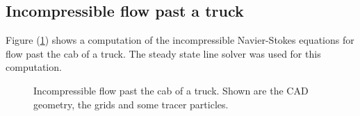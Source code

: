 \subsection{Incompressible flow past a truck}\label{sec:truckFlow}

Figure (\ref{fig:cabTender}) shows a computation of the incompressible Navier-Stokes
equations for flow past the cab of a truck. The steady state line solver was used for this
computation.



{
\newcommand{\figWidthd}{7.5cm}
\newcommand{\trimfig}[2]{\trimPlot{#1}{#2}{.0}{.0}{.075}{.15}}
\newcommand{\figWidtha}{10cm}
\newcommand{\trimfiga}[2]{\trimPlot{#1}{#2}{.0}{.0}{.2}{.2}}
\begin{figure}[hbt]
\begin{center}
\end{center}
\caption{Incompressible flow past the cab of a truck. Shown are the CAD geometry, the grids and
     some tracer particles.} \label{fig:cabTender}
\end{figure}
}


